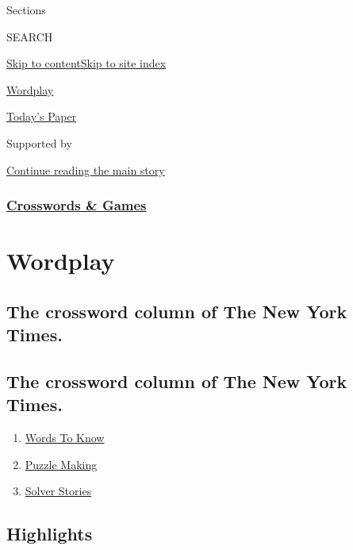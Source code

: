 Sections

SEARCH

\protect\hyperlink{site-content}{Skip to
content}\protect\hyperlink{site-index}{Skip to site index}

\href{https://www.nytimes.com/column/wordplay}{Wordplay}

\href{https://myaccount.nytimes.com/auth/login?response_type=cookie\&client_id=vi}{}

\href{https://www.nytimes.com/section/todayspaper}{Today's Paper}

Supported by

\protect\hyperlink{after-sponsor}{Continue reading the main story}

\hypertarget{crosswords--games}{%
\subsubsection{\texorpdfstring{\href{/crosswords/index.html}{Crosswords
\& Games}}{Crosswords \& Games}}\label{crosswords--games}}

\hypertarget{wordplay}{%
\section{Wordplay}\label{wordplay}}

\hypertarget{the-crossword-column-of-the-new-york-times}{%
\subsection{The crossword column of The New York
Times.}\label{the-crossword-column-of-the-new-york-times}}

\hypertarget{the-crossword-column-of-the-new-york-times-1}{%
\subsection{The crossword column of The New York
Times.}\label{the-crossword-column-of-the-new-york-times-1}}

\begin{enumerate}
\def\labelenumi{\arabic{enumi}.}
\tightlist
\item
  \href{/spotlight/words-to-know}{Words To Know}
\item
  \href{/spotlight/puzzle-making}{Puzzle Making}
\item
  \href{/spotlight/solver-stories}{Solver Stories}
\end{enumerate}

\hypertarget{highlights}{%
\subsection{Highlights}\label{highlights}}

